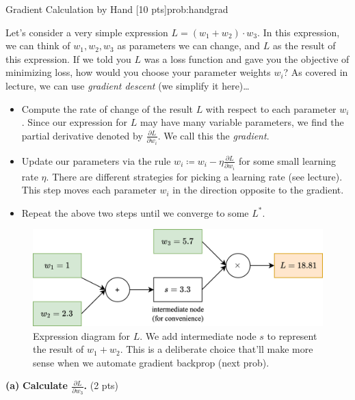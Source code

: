 
\begin{problem}{Gradient Calculation by Hand \hfill [10 pts]}{prob:handgrad}
\label{prob:handgrad}

Let's consider a very simple expression $L = (w_1 + w_2) \cdot w_3$. In this
expression, we can think of $w_1, w_2, w_3$ as parameters we can change, and $L$
as the result of this expression. If we told you $L$ was a loss function and
gave you the objective of minimizing loss, how would you choose your parameter
weights $w_i$? As covered in lecture, we can use \textit{gradient descent} (we
simplify it here)\ldots

\begin{itemize}
    \item Compute the rate of change of the result $L$ with respect to each
        parameter $w_i$. Since our expression for $L$ may have many variable
        parameters, we find the partial derivative denoted by $\frac{\partial
        L}{\partial w_i}$. We call this the \textit{gradient}. 
    \item Update our parameters via the rule $w_i \coloneq w_i -\eta
        \frac{\partial L}{\partial w_i}$ for some small learning rate $\eta$.
        There are different strategies for picking a learning rate (see
        lecture). This step moves each parameter $w_i$ in the direction opposite
        to the gradient.
    \item Repeat the above two steps until we converge to some $L^*$.
\end{itemize}

\begin{figure}[H]
    \centering
    \includegraphics[width=0.7\linewidth]{media/hand_backprop.png}
    \caption{Expression diagram for $L$. We add intermediate node $s$ to
    represent the result of $w_1 + w_2$. This is a deliberate choice that'll
make more sense when we automate gradient backprop (next prob).}
    \label{fig:handbackprop}
\end{figure}

\begin{adjustwidth}{2em}{2em}
    
\textbf{(a)} \textbf{Calculate $\frac{\partial L}{\partial w_3}$.} \hfill (2 pts)


\end{adjustwidth}
\end{problem}
